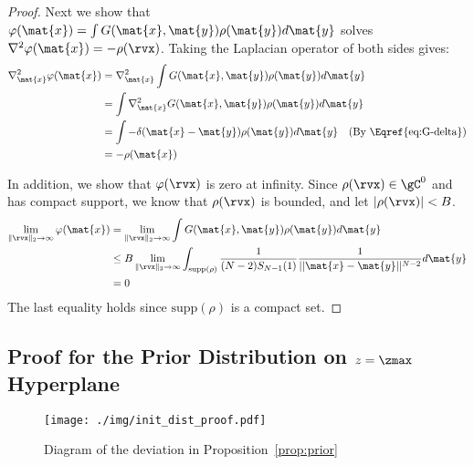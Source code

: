 \begin{proof}
Next we show that $\varphi(\mat{x}) = \int G(\mat{x},\mat{y})\rho(\mat{y})d\mat{y}$ solves $\nabla^2 \varphi(\mat{x}) = -\rho(\rvx)$. Taking the Laplacian operator of both sides gives:
\begin{align*}
    \nabla^2_{\mat{x}} \varphi(\mat{x}) &= \nabla^2_{\mat{x}} \int G(\mat{x},\mat{y})\rho(\mat{y})d\mat{y}\\
    &=\int \nabla^2_{\mat{x}} G(\mat{x},\mat{y})\rho(\mat{y})d\mat{y}\\
    &= \int  -\delta(\mat{x}-\mat{y})\rho(\mat{y})d\mat{y}\quad \textrm{(By \Eqref{eq:G-delta})}\\
    &= -\rho(\mat{x})
\end{align*}

In addition, we show that $\varphi(\rvx)$ is zero at infinity. Since $\rho(\rvx) \in \gC^0$ and has compact support, we know that $\rho(\rvx)$ is bounded, and let $|\rho(\rvx)|<B$.
\begin{align*}
    \lim_{\parallel \rvx \parallel_2 \to \infty}\varphi(\mat{x}) &= \lim_{\parallel \rvx \parallel_2 \to \infty}\int G(\mat{x},\mat{y})\rho(\mat{y})d\mat{y}\\
    &\le B\lim_{\parallel \rvx \parallel_2 \to \infty}\int_{\textrm{supp}(\rho)}\frac{1}{(N-2)S_{N-1}(1)}\frac{1}{||\mat{x}-\mat{y}||^{N-2}}d\mat{y}\\
    &=0
\end{align*}
The last equality holds since $\textrm{supp}(\rho)$ is a compact set.
\end{proof}

\subsection{Proof for the Prior Distribution on $z=\zmax$ Hyperplane}\label{app:prior_distribution}

\begin{figure}[htbp]
    \centering
    \texttt{[image: ./img/init\_dist\_proof.pdf]}
    \caption{Diagram of the deviation in Proposition~\ref{prop:prior}}
    \label{fig:init_dist}
\end{figure}

